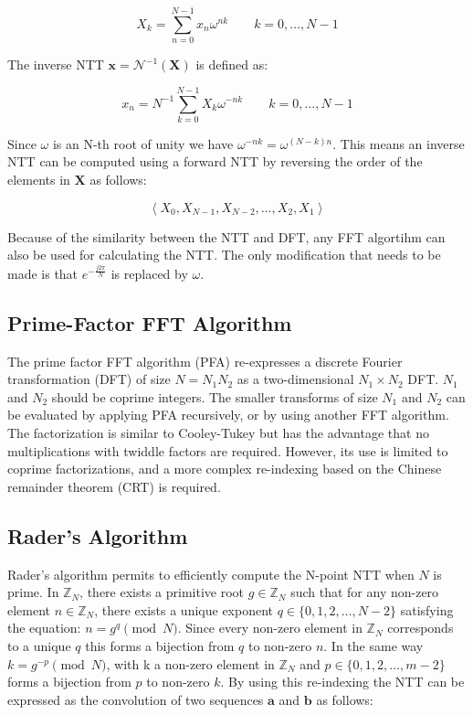 \documentclass[lettersize,journal]{IEEEtran}
\begin{document}
\begin{equation}
X_k = \sum_{n=0}^{N-1} x_n \omega^{nk} \qquad k=0,\ldots,N-1
\end{equation}

The inverse NTT $\mathbf{x}=\mathcal{N}^{-1}\left(\mathbf{X}\right)$ is defined as:

\begin{equation}
x_n = N^{-1}\sum_{k=0}^{N-1} X_k \omega^{-nk} \qquad k=0,\ldots,N-1
\end{equation}

Since $\omega$ is an N-th root of unity we have $\omega^{-nk} = \omega^{(N-k)n}$. This means an inverse NTT can be computed using a forward NTT by reversing the order of the elements in $\mathbf{X}$ as follows:

\begin{equation}
\label{eq:reverse_order}
\left \langle X_0, X_{N-1}, X_{N-2}, \ldots, X_2, X_1 \right \rangle
\end{equation}

Because of the similarity between the NTT and DFT, any FFT algortihm can also be used for calculating the NTT.
The only modification that needs to be made is that $e^{-\frac{j2\pi}{N}}$ is replaced by $\omega$. \cite{1162555}

\subsection{Prime-Factor FFT Algorithm}
The prime factor FFT algorithm (PFA) re-expresses a discrete Fourier transformation (DFT) of size $N = N_1 N_2$ as a two-dimensional $N_1 \times N_2$ DFT. \cite{1671829} $N_1$ and $N_2$ should be coprime integers. The smaller transforms of size $N_1$ and $N_2$ can be evaluated by applying PFA recursively, or by using another FFT algorithm. The factorization is similar to Cooley-Tukey but has the advantage that no multiplications with twiddle factors are required. However, its use is limited to coprime factorizations, and a more complex re-indexing based on the Chinese remainder theorem (CRT) is required.

\subsection{Rader's Algorithm}
Rader's algorithm permits to efficiently compute the N-point NTT when $N$ is prime. \cite{1448407} In $\mathbb{Z}_N$, there exists a primitive root $g \in \mathbb{Z}_N$ such that for any non-zero element $n \in \mathbb{Z}_N$, there exists a unique exponent $q \in \{0, 1, 2, \ldots, N-2\}$ satisfying the equation: $n = g^q \pmod{N}$. Since every non-zero element in $\mathbb{Z}_N$ corresponds to a unique $q$ this forms a bijection from $q$ to non-zero $n$. In the same way $k = g^{-p} \pmod{N}$, with k a non-zero element in $\mathbb{Z}_N$ and $p \in \{0, 1, 2, \ldots, m-2\}$ forms a bijection from $p$ to non-zero $k$. By using this re-indexing the NTT can be expressed as the convolution of two sequences $\mathbf{a}$ and $\mathbf{b}$ as follows:
\end{document}
